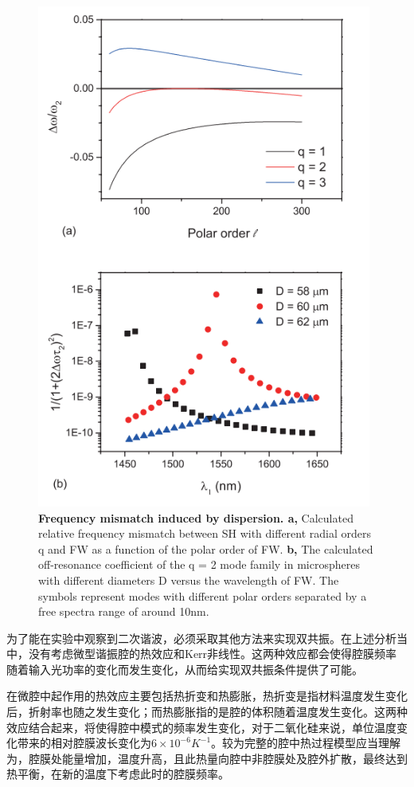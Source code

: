 \documentclass[UTF8,a4paper,cs4size,hyperref]{ctexart}
\begin{document}
\begin{figure}
\centering
\includegraphics[width=11cm]{disp_ed2_ai.png}
\caption{\textbf{Frequency mismatch induced by dispersion. a,}   Calculated relative
frequency mismatch between SH with different radial orders q and FW as a function of
the polar order of FW.   \textbf{b,}  The calculated off-resonance coefficient of the
q = 2 mode family in microspheres with different diameters D versus the wavelength of
FW. The symbols represent modes with different polar orders separated by a free spectra
range of around 10nm.}
\label{pic:mode}
\end{figure}

为了能在实验中观察到二次谐波，必须采取其他方法来实现双共振。在上述分析当中，没有考虑微型谐振腔的热效应和Kerr非线性。这两种效应都会使得腔膜频率随着输入光功率的变化而发生变化，从而给实现双共振条件提供了可能。

在微腔中起作用的热效应主要包括热折变和热膨胀，热折变是指材料温度发生变化后，折射率也随之发生变化；而热膨胀指的是腔的体积随着温度发生变化。这两种效应结合起来，将使得腔中模式的频率发生变化，对于二氧化硅来说，单位温度变化带来的相对腔膜波长变化为$6\times 10^{-6} K^{-1}$\cite{nikogosyan2003properties,carmon2004dynamical}。较为完整的腔中热过程模型应当理解为，腔膜处能量增加，温度升高，且此热量向腔中非腔膜处及腔外扩散\cite{ilchenko1992thermal}，最终达到热平衡，在新的温度下考虑此时的腔膜频率。
\end{document}
